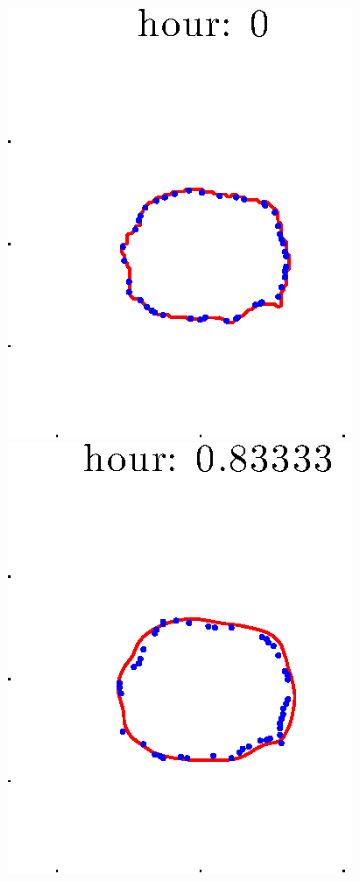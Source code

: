 \documentclass[12pt]{article}
\begin{document}
\begin{figure}[h!]
\begin{subfigure}[b]{.3\textwidth}
	\end{subfigure}
	\begin{subfigure}[b]{.3\textwidth}
	\centering
		\includegraphics[height=.15\textheight]{Pos10exp2/firsthalf/first1.eps}
		\includegraphics[height=.15\textheight]{Pos10exp2/firsthalf/first2.eps}

\end{subfigure}
\end{figure}
\end{document}
